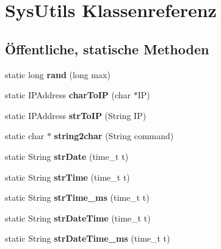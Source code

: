 \hypertarget{class_sys_utils}{}\section{Sys\+Utils Klassenreferenz}
\label{class_sys_utils}
\subsection*{Öffentliche, statische Methoden}
\begin{DoxyCompactItemize}
\item 
\mbox{\label{class_sys_utils_a50dac2b668ef371816e5a1e304079a58}} 
static long {\bfseries rand} (long max)
\item 
\mbox{\label{class_sys_utils_a4bc82b33a63dcc0ae82ebef407597f98}} 
static I\+P\+Address {\bfseries char\+To\+IP} (char $\ast$IP)
\item 
\mbox{\label{class_sys_utils_a44dcc4af3a7b24cda66b631f143091e5}} 
static I\+P\+Address {\bfseries str\+To\+IP} (String IP)
\item 
\mbox{\label{class_sys_utils_aac2eed5ca71ab6c90961e6c53c4f871b}} 
static char $\ast$ {\bfseries string2char} (String command)
\item 
\mbox{\label{class_sys_utils_a02d7d2d29d456083b5df9ab732ef7682}} 
static String {\bfseries str\+Date} (time\+\_\+t t)
\item 
\mbox{\label{class_sys_utils_ab0a24909211407b58a8400b22ae95db5}} 
static String {\bfseries str\+Time} (time\+\_\+t t)
\item 
\mbox{\label{class_sys_utils_a64f16b8c4cdde00cb9bcab6de4e5ceb4}} 
static String {\bfseries str\+Time\+\_\+ms} (time\+\_\+t t)
\item 
\mbox{\label{class_sys_utils_a32700011267ea8e220e0e648f5e4f014}} 
static String {\bfseries str\+Date\+Time} (time\+\_\+t t)
\item 
\mbox{\label{class_sys_utils_a042a58a4c1115579c9a7e10f5d1d15f1}} 
static String {\bfseries str\+Date\+Time\+\_\+ms} (time\+\_\+t t)
\end{DoxyCompactItemize}
